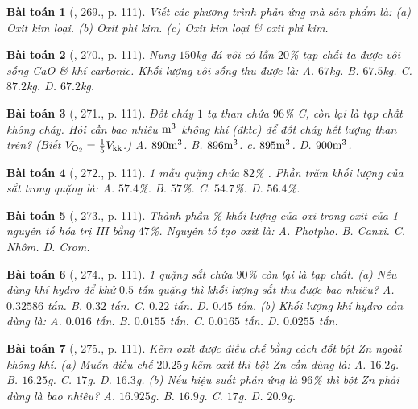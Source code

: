 \documentclass{article}
\newtheorem{baitoan}{Bài toán}
\begin{document}
\begin{baitoan}[\cite{An_400_BT_Hoa_Hoc_8_2020}, 269., p. 111]
	Viết các phương trình phản ứng mà sản phẩm là: (a) Oxit kim loại. (b) Oxit phi kim. (c) Oxit kim loại \& oxit phi kim.
\end{baitoan}

\begin{baitoan}[\cite{An_400_BT_Hoa_Hoc_8_2020}, 270., p. 111]
	Nung $150$\emph{kg} đá vôi có lẫn $20$\% tạp chất ta được vôi sống \emph{CaO} \& khí carbonic. Khối lượng vôi sống thu được là: {\sf A.} $67$\emph{kg}. {\sf B.} $67.5$\emph{kg}. {\sf C.} $87.2$\emph{kg}. {\sf D.} $67.2$\emph{kg}.
\end{baitoan}

\begin{baitoan}[\cite{An_400_BT_Hoa_Hoc_8_2020}, 271., p. 111]
	Đốt cháy $1$ tạ than chứa $96$\% \emph{C}, còn lại là tạp chất không cháy. Hỏi cần bao nhiêu $\rm m^3$ không khí (đktc) để đốt cháy hết lượng than trên? (Biết $V_{\rm O_2} = \frac{1}{5}V_{\rm kk}$.) {\sf A.} $890\rm m^3$. {\sf B.} $896\rm m^3$. {\sf c.} $895\rm m^3$. {\sf D.} $900\rm m^3$. 
\end{baitoan}

\begin{baitoan}[\cite{An_400_BT_Hoa_Hoc_8_2020}, 272., p. 111]
	1 mẫu quặng chứa $82$\% \emph{}. Phần trăm khối lượng của sắt trong quặng là: {\sf A.} $57.4$\%. {\sf B.} $57$\%. {\sf C.} $54.7$\%. {\sf D.} $56.4$\%.
\end{baitoan}

\begin{baitoan}[\cite{An_400_BT_Hoa_Hoc_8_2020}, 273., p. 111]
	Thành phần \% khối lượng của oxi trong oxit của 1 nguyên tố hóa trị III bằng $47$\%. Nguyên tố tạo oxit là: {\sf A.} Photpho. {\sf B.} Canxi. {\sf C.} Nhôm. {\sf D.} Crom.
\end{baitoan}

\begin{baitoan}[\cite{An_400_BT_Hoa_Hoc_8_2020}, 274., p. 111]
	1 quặng sắt chứa $90$\% \emph{} còn lại là tạp chất. (a) Nếu dùng khí hydro để khử $0.5$ tấn quặng thì khối lượng sắt thu được bao nhiêu? {\sf A.} $0.32586$ tấn. {\sf B.} $0.32$ tấn. {\sf C.} $0.22$ tấn. {\sf D.} $0.45$ tấn. (b) Khối lượng khí hydro cần dùng là:  {\sf A.} $0.016$ tấn. {\sf B.} $0.0155$ tấn. {\sf C.} $0.0165$ tấn. {\sf D.} $0.0255$ tấn.
\end{baitoan}

\begin{baitoan}[\cite{An_400_BT_Hoa_Hoc_8_2020}, 275., p. 111]
	Kẽm oxit được điều chế bằng cách đốt bột \emph{Zn} ngoài không khí. (a) Muốn điều chế $20.25$\emph{g} kẽm oxit thì bột \emph{Zn} cần dùng là: {\sf A.} $16.2$\emph{g}. {\sf B.} $16.25$\emph{g}. {\sf C.} $17$\emph{g}. {\sf D.} $16.3$\emph{g}. (b) Nếu hiệu suất phản ứng là $96$\% thì bột \emph{Zn} phải dùng là bao nhiêu? {\sf A.} $16.925$\emph{g}. {\sf B.} $16.9$\emph{g}. {\sf C.} $17$\emph{g}. {\sf D.} $20.9$\emph{g}.
\end{baitoan}
\end{document}
